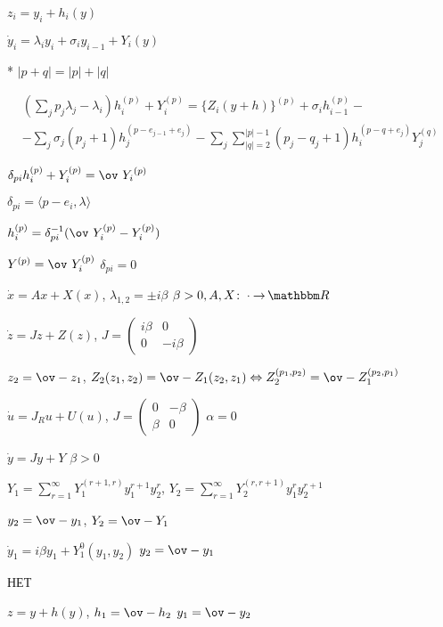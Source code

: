 \documentclass[timbord]{longnotes}
\begin{document}
\begin{list}
  \item $z_i = y_i + h_i(y)$
  \item $\dot y_i = \lambda_i y_i + \sigma_i y_{i-1} + Y_i(y)$
  \item [*] $|p +q| = |p| + |q|$ \hfill{\flame}
  \item $\begin{aligned}
      &\left(\sum_j p_j \lambda_j - \lambda_i\right) h_i^{(p)} + Y_i^{(p)} 
      =  \bigl\{Z_i(y + h) \bigr\}^{(p)} + \sigma_i h_{i-1}^{(p)} - \\ 
      &- \sum_j \sigma_j (p_j + 1) h_j ^{(p-e_{j-1}+e_j)} 
      - \sum_j \sum\limits_{|q|=2}^{|p|-1}(p_j - q_j +1) h_i^{(p-q+e_j)} Y_j^{(q)} 
    \end{aligned}$
  \item $\delta_{pi}h_i ^{(p)} + Y_i^{(p)} = \ov~{Y_i}^{(p)}$
  \item $\delta_{pi} = \langle p-e_i, \lambda \rangle$
  \item $h_i^{(p)} = \delta_{pi}^{-1} (\ov~{Y}_i^{(p)} - Y_i ^{(p)})$
  \item $Y^{(p)} = \ov~{Y}_i^{(p)}$ \hfill $\delta_{pi}= 0$
  \item $\dot x = Ax + X(x)$, $\lambda_{1,2} = \pm i \beta$ \hfill $\beta >0, A,X\colon\cdot\to\R$
  \item $\dot z= Jz + Z(z)$, $J = \left(\begin{matrix}
      i \beta & 0 \\ 0& -i \beta
  \end{matrix}\right)
  $
  \item $z_2 = \ov- z_1$, 
    $Z_2(z_1, z_2) = \ov-{Z}_1 (z_2, z_1) \Leftrightarrow Z_2^{(p_1,p_2)} = \ov-Z_1^{(p_2, p_1)}$
  \item $\dot u = J_R u + U(u)$,
    $J = \left(
      \begin{matrix}
        0 & -\beta \\ \beta & 0 
      \end{matrix}
    \right)$ \hfill $\alpha = 0$
  \item $\dot y = Jy+Y$ \hfill $\beta >0$
  \item $Y_1 = \sum_{r=1}^\infty Y_1^{(r+1,r)} y_1^{r+1} y_2 ^{r}$, \quad 
    $Y_2 = \sum_{r=1}^\infty Y_2^{(r,r+1)} y_1^{r} y_2 ^{r+1}$
  \item $y_2 = \ov-y_1$, $Y_2 = \ov-Y_1$
  \item $\dot y_1 = i \beta y_1 + Y_1^0 (y_1,y_2)$ \hfill $y_2 = \ov-y_1$
  \item НЕТ
  \item $z=y + h(y)$, $h_1 = \ov-h_2$ \hfill $y_1 = \ov- y_2$

\end{list}
\end{document}
